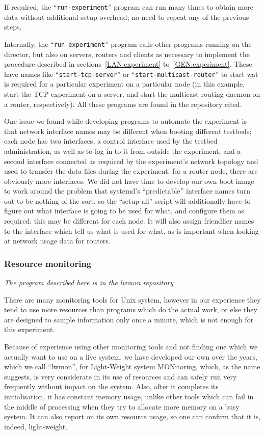\documentclass[a4paper,12pt]{article}
\begin{document}
If required, the ``{\tt run-experiment}'' program can run many times
to obtain more data without additional setup overhead; no need to
repeat any of the previous steps.

Internally, the ``{\tt run-experiment}'' program calls other programs
running on the director, but also on servers, routers and clients
as necessary to implement the procedure described in
sections~\ref{LAN:experiment} to~\ref{GEN:experiment}. These
have names like ``{\tt start-tcp-server}'' or
``{\tt start-multicast-router}'' to start wat is required for
a particular experiment on a particular node (in this example,
start the TCP experiment on a server, and start the multicast
routing daemon on a router, respectively).  All these programs are
found in the repository cited.

One issue we found while developing programs to automate the experiment
is that network interface names may be different when booting
different testbeds; each node has two interfaces, a control
interface used by the testbed administration, as well as to log
in to it from outside the experiment, and a second interface
connected as required by the experiment's network topology and
used to transfer the data files during the experiment; for a router
node, there are obviously more interfaces.  We did not have time
to develop our own boot image to work around the problem that
systemd's ``predictable'' interface names turn out to be nothing
of the sort, so the ``setup-all'' script will additionally have
to figure out what interface is going to be used for what, and
configure them as required: this may be different for each node.
It will also assign friendlier names to the interface which tell
us what is used for what, as is important when looking at network
usage data for routers.

\subsubsection{Resource monitoring}
{\em The program described here is in the lwmon repository~\cite{lwmon}.}

There are many monitoring tools for Unix system, however in our experience
they tend to use more resources than programs which do the actual work,
or else they are designed to sample information only once a minute,
which is not enough for this experiment.

Because of experience using other monitoring tools and not finding
one which we actually want to use on a live system, we have developed
our own over the years, which we call ``lwmon'', for Light-Weight
system MONitoring, which, as the name suggests, is very considerate
in its use of resources and can safely run very frequently without
impact on the system.  Also, after it completes its initialisation,
it has constant memory usage, unlike other tools which can fail
in the middle of processing when they try to allocate more memory
on a busy system.  It can also report on its own resource usage,
so one can confirm that it is, indeed, light-weight.
\end{document}
